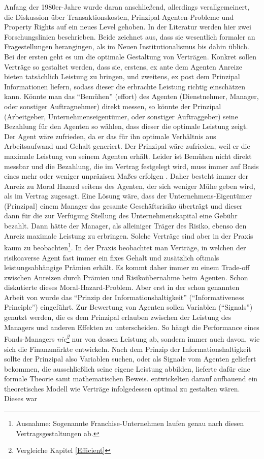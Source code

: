 Anfang der 1980er-Jahre wurde daran anschließend, allerdings verallgemeinert, die Diskussion über Transaktionskosten, Prinzipal-Agenten-Probleme und Property Rights auf ein neues Level gehoben. In der Literatur \parencite[S. 2]{Nobelpreis-Komitee2016} werden hier zwei Forschungslinien beschrieben. Beide zeichnet aus, dass sie wesentlich formaler an Fragestellungen herangingen, als im Neuen Institutionalismus bis dahin üblich. Bei der ersten geht es um die optimale Gestaltung von Verträgen. Konkret sollen Verträge so gestaltet werden, dass sie, erstens, ex ante dem Agenten Anreize bieten tatsächlich Leistung zu bringen, und zweitens, ex post dem Prinzipal Informationen liefern, sodass dieser die erbrachte Leistung richtig einschätzen kann. Könnte man das "`Bemühen"' (effort) des Agenten (Dienstnehmer, Manager, oder sonstiger Auftragnehmer) direkt messen, so könnte der Prinzipal (Arbeitgeber, Unternehmenseigentümer, oder sonstiger Auftraggeber) seine Bezahlung für den Agenten so wählen, dass dieser die optimale Leistung zeigt. Der Agent wäre zufrieden, da er das für ihn optimale Verhältnis aus Arbeitsaufwand und Gehalt generiert. Der Prinzipal wäre zufrieden, weil er die maximale Leistung von seinem Agenten erhält. Leider ist Bemühen nicht direkt messbar und die Bezahlung, die im Vertrag festgelegt wird, muss immer auf Basis eines mehr oder weniger unpräzisen Maßes erfolgen \parencite[S. 6]{Nobelpreis-Komitee2016}. Daher besteht immer der Anreiz zu Moral Hazard seitens des Agenten, der sich weniger Mühe geben wird, als im Vertrag zugesagt. Eine Lösung wäre, dass der Unternehmens-Eigentümer (Prinzipal) einem Manager das gesamte Geschäftsrisiko überträgt und dieser dann für die zur Verfügung Stellung des Unternehmenskapital eine Gebühr bezahlt. Dann hätte der Manager, als alleiniger Träger des Risiko, ebenso den Anreiz maximale Leistung zu erbringen. Solche Verträge sind aber in der Praxis kaum zu beobachten\footnote{Ausnahme: Sogenannte Franchise-Unternehmen laufen genau nach diesen Vertragsgestaltungen ab.}. In der Praxis beobachtet man Verträge, in welchen der risikoaverse Agent fast immer ein fixes Gehalt und zusätzlich oftmals leistungsabhängige Prämien erhält. Es kommt daher immer zu einem Trade-off zwischen Anreizen durch Prämien und Risikoübernahme beim Agenten. Schon \textcite{Mirrlees1999} diskutierte dieses Moral-Hazard-Problem. Aber erst  in der schon genannten Arbeit von \textcite{Holmstrom1979} wurde das "`Prinzip der Informationshaltigkeit"' ("`Informativeness Principle"') eingeführt. Zur Bewertung von Agenten sollen Variablen ("`Signals"') genutzt werden, die es dem Prinzipal erlauben zwischen der Leistung des Managers und anderen Effekten zu unterscheiden. So hängt die Performance eines Fonds-Managers \textit{nie\footnote{Vergleiche Kapitel \ref{Efficient}}} nur von dessen Leistung ab, sondern immer auch davon, wie sich die Finanzmärkte entwickeln. Nach dem Prinzip der Informationshaltigkeit sollte der Prinzipal also Variablen suchen, oder als Signale vom Agenten geliefert bekommen, die ausschließlich seine eigene Leistung abbilden, \textcite{Holmstrom1979} lieferte dafür eine formale Theorie samt mathematischen Beweis. \textcite{Grossman1983} entwickelten darauf aufbauend ein theoretisches Modell wie Verträge infolgedessen optimal zu gestalten wären. Dieses war 